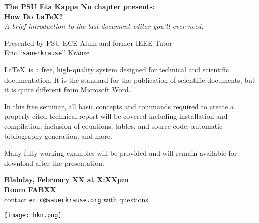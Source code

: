 \documentclass{article}
\begin{document}
    \begin{center} \LARGE 
        \textbf{The PSU Eta Kappa Nu chapter presents:}\\\vspace*{.25in}
        {\Huge \bf How Do \LaTeX?}\\
                        \Large \textit{A brief introduction to the last document editor you'll ever need.}\vspace{.25in}

        Presented by PSU ECE Alum and former IEEE Tutor\\
        Eric ``\texttt{sauerkrause}'' Krause\\     
    \end{center}\vspace{.15in}

    \Large\LaTeX\ is a  free, high-quality system designed for technical and scientific documentation. It is the standard for the publication of scientific documents, but it is quite different from Microsoft Word.\vspace{.2in}

    In this free seminar, all basic concepts and commands required to create a properly-cited technical report will be covered including installation and compilation, inclusion of equations, tables, and source code, automatic bibliography generation, and more.\vspace{.2in}

    Many fully-working examples will be provided and will remain available for download after the presentation. 
  
    \begin{center} \Huge
        \textbf{Blahday, February XX at X:XXpm\\Room FABXX\\}\vspace{.2in}
        \Large contact \texttt{\href{mailto:eric@sauerkrause.org}{eric@sauerkrause.org}} with questions\\        \vspace*{.15in}

        \texttt{[image: hkn.png]}
    \end{center}
\end{document}
